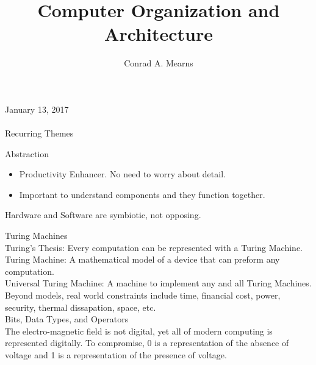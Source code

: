 \documentclass{article}
\title{Computer Organization and Architecture}
\author{Conrad A. Mearns}
\begin{document}
\maketitle

\noindent
\Large January 13, 2017\\\\
Recurring Themes
\normalsize
\noindent

Abstraction
\begin{itemize}
  \item Productivity Enhancer. No need to worry about detail.
  \item Important to understand components and they function together.
\end{itemize}

Hardware and Software are symbiotic, not opposing.

\noindent
\Large Turing Machines\\
\normalsize
\noindent
Turing's Thesis: Every computation can be represented with a Turing Machine.\\
Turing Machine: A mathematical model of a device that can preform any computation.\\
Universal Turing Machine: A machine to implement any and all Turing Machines.\\

Beyond models, real world constraints include time, financial cost, power, security, thermal dissapation, space, etc.\\

\noindent
\Large Bits, Data Types, and Operators\\
\normalsize
\noindent
The electro-magnetic field is not digital, yet all of modern computing is represented digitally. To compromise, 0 is a representation of the absence of voltage and 1 is a representation of the presence of voltage.

\centering
{}
\raggedright
\end{document}
